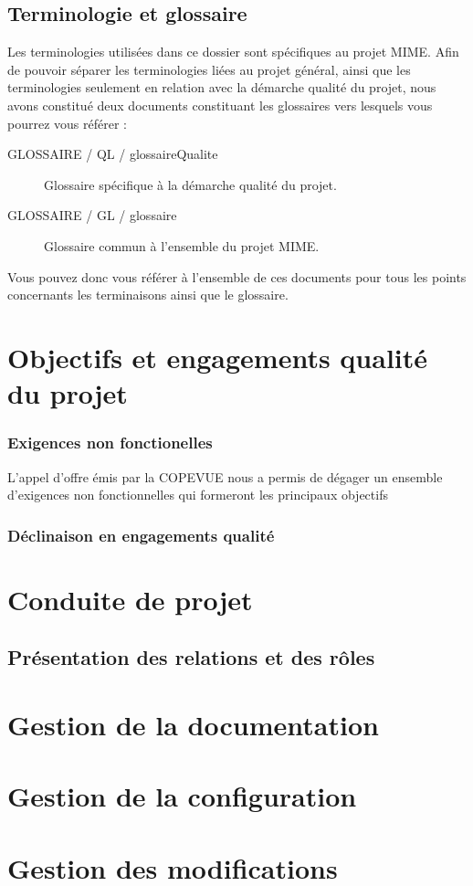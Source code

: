 \documentclass{mise_en_page}
\begin{document}
\subsection{Terminologie et glossaire}

Les terminologies utilisées dans ce dossier sont spécifiques au projet MIME. Afin de pouvoir séparer les terminologies liées au projet général, ainsi que les terminologies seulement en relation avec la démarche qualité du projet, nous avons constitué deux documents constituant les glossaires vers lesquels vous pourrez vous référer :

\begin{description}
	\item[GLOSSAIRE / QL / glossaireQualite ] Glossaire spécifique à la démarche qualité du projet.
	\item[GLOSSAIRE / GL / glossaire ] Glossaire commun à l'ensemble du projet MIME.
\end{description}

Vous pouvez donc vous référer à l'ensemble de ces documents pour tous les points concernants les terminaisons ainsi que le glossaire.

\section{Objectifs et engagements qualité du projet}

\subsubsection{Exigences non fonctionelles}

L'appel d'offre émis par la COPEVUE nous a permis de dégager un ensemble d'exigences non fonctionnelles qui formeront les principaux objectifs 

\subsubsection{Déclinaison en engagements qualité}

\section{Conduite de projet}

\subsection{Présentation des relations et des rôles}


\section{Gestion de la documentation}



\section{Gestion de la configuration}

\section{Gestion des modifications}
\end{document}
